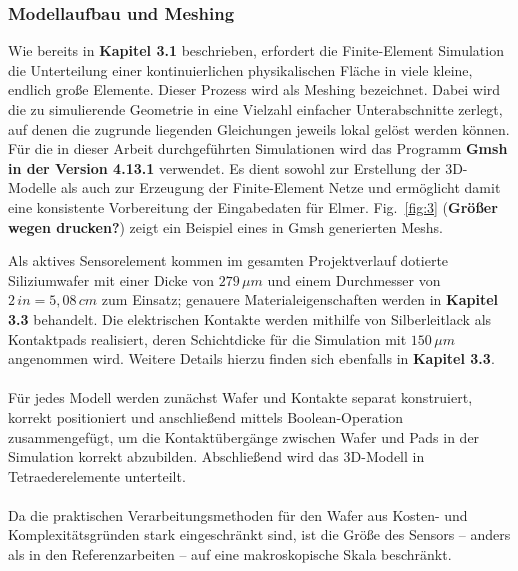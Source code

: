 \documentclass[12pt, a4paper]{article}
\begin{document}
\subsubsection{Modellaufbau und Meshing}
Wie bereits in \textbf{Kapitel 3.1} beschrieben, erfordert die Finite-Element Simulation die Unterteilung einer kontinuierlichen physikalischen Fläche in viele kleine, endlich große Elemente. Dieser Prozess wird als Meshing bezeichnet. Dabei wird die zu simulierende Geometrie in eine Vielzahl einfacher Unterabschnitte zerlegt, auf denen die zugrunde liegenden Gleichungen jeweils lokal gelöst werden können.\newline
Für die in dieser Arbeit durchgeführten Simulationen wird das Programm \textbf{Gmsh in der Version 4.13.1} verwendet. Es dient sowohl zur Erstellung der 3D-Modelle als auch zur Erzeugung der Finite-Element Netze und ermöglicht damit eine konsistente Vorbereitung der Eingabedaten für Elmer. Fig.~\ref{fig:3} (\textbf{Größer wegen drucken?}) zeigt ein Beispiel eines in Gmsh generierten Meshs.
\newline

Als aktives Sensorelement kommen im gesamten Projektverlauf dotierte Siliziumwafer mit einer Dicke von $279\,\mu{m}$ und einem Durchmesser von $2\,in=5,08\,cm$ zum Einsatz; genauere Materialeigenschaften werden in \textbf{Kapitel 3.3} behandelt.\newline
Die elektrischen Kontakte werden mithilfe von Silberleitlack als Kontaktpads realisiert, deren Schichtdicke für die Simulation mit $150\,\mu{m}$ angenommen wird. Weitere Details hierzu finden sich ebenfalls in \textbf{Kapitel 3.3}.\paragraph{}

Für jedes Modell werden zunächst Wafer und Kontakte separat konstruiert, korrekt positioniert und anschließend mittels Boolean-Operation zusammengefügt, um die Kontaktübergänge zwischen Wafer und Pads in der Simulation korrekt abzubilden. Abschließend wird das 3D-Modell in Tetraederelemente unterteilt.\paragraph{}

Da die praktischen Verarbeitungsmethoden für den Wafer aus Kosten- und Komplexitätsgründen stark eingeschränkt sind, ist die Größe des Sensors – anders als in den Referenzarbeiten – auf eine makroskopische Skala beschränkt.
\end{document}
